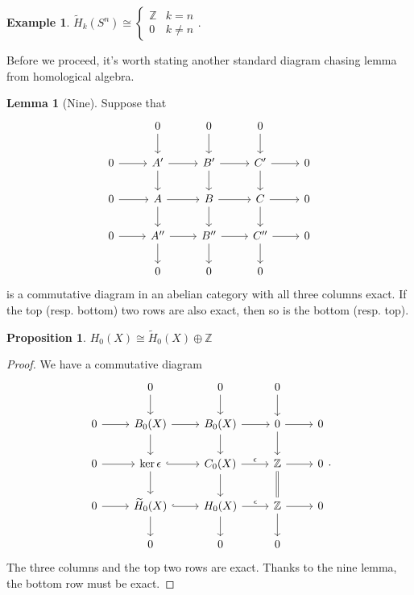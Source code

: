 \documentclass[10pt,letterpaper,cm]{nupset}
\theoremstyle{definition}
\newtheorem{exmp}[definition]{Example}
\theoremstyle{theorem}
\newtheorem{lemma}[definition]{Lemma}
\newtheorem{prop}[definition]{Proposition}
\theoremstyle{remark}
\newcommand{\Z}{\mathbb Z}
\newcommand{\1}{\mathbb{1}}
\newcommand{\0}{\vec 0}
\begin{document}
\begin{exmp}
$\widetilde{H}_k(S^n) \cong \begin{cases} \Z & k = n \\  0& k \ne n \end{cases}.$
\end{exmp}

\smallskip

Before we proceed, it's worth stating another standard diagram chasing lemma from homological algebra.

\begin{lemma}[Nine]
Suppose that 
\[
\begin{tikzcd}
            & 0 \arrow[d]             & 0 \arrow[d]             & 0 \arrow[d]             &   \\
0 \arrow[r] & A' \arrow[r] \arrow[d]  & B' \arrow[r] \arrow[d]  & C' \arrow[r] \arrow[d]  & 0 \\
0 \arrow[r] & A \arrow[r] \arrow[d]   & B \arrow[r] \arrow[d]   & C \arrow[r] \arrow[d]   & 0 \\
0 \arrow[r] & A'' \arrow[r] \arrow[d] & B'' \arrow[r] \arrow[d] & C'' \arrow[r] \arrow[d] & 0 \\
            & 0                       & 0                       & 0                       &  
\end{tikzcd}
\] is a commutative diagram in an abelian category with all three columns exact. If the top (resp. bottom) two rows are also exact, then so is the bottom (resp. top).
\end{lemma}

\begin{prop}
$H_0(X) \cong \widetilde{H}_0(X) \oplus \Z$
\end{prop}
\begin{proof}
We have a commutative diagram
\[
\begin{tikzcd}
            & 0 \arrow[d]                                  & 0 \arrow[d]                            & 0 \arrow[d]            &   \\
0 \arrow[r] & B_0(X) \arrow[d] \arrow[r]                   & B_0(X) \arrow[d] \arrow[r]             & 0 \arrow[d] \arrow[r]  & 0 \\
0 \arrow[r] & \ker{\epsilon} \arrow[d] \arrow[r, hook]     & C_0(X) \arrow[d] \arrow[r, "\epsilon"] & \Z \arrow[d, equal] \arrow[r] & 0 \\
0 \arrow[r] & \widetilde{H}_0(X) \arrow[d] \arrow[r, hook] & H_0(X) \arrow[d] \arrow[r, "\epsilon"] & \Z \arrow[d] \arrow[r] & 0 \\
            & 0                                            & 0                                      & 0                      &  
\end{tikzcd}
.\] The three columns and the top two rows are exact. Thanks to the  nine lemma, the bottom row must be exact.
\end{proof}
\end{document}

